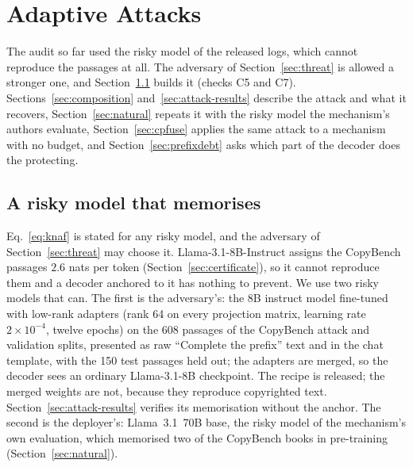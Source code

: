 \section{Adaptive Attacks}\label{sec:attacks}

The audit so far used the risky model of the released logs, which cannot reproduce the passages at all. The adversary of Section~\ref{sec:threat} is allowed a stronger one, and Section~\ref{sec:memorising} builds it (checks C5 and C7). Sections~\ref{sec:composition} and~\ref{sec:attack-results} describe the attack and what it recovers, Section~\ref{sec:natural} repeats it with the risky model the mechanism's authors evaluate, Section~\ref{sec:cpfuse} applies the same attack to a mechanism with no budget, and Section~\ref{sec:prefixdebt} asks which part of the decoder does the protecting.

\subsection{A risky model that memorises}\label{sec:memorising}
Eq.~\eqref{eq:knaf} is stated for any risky model, and the adversary of Section~\ref{sec:threat} may choose it. Llama-3.1-8B-Instruct assigns the CopyBench passages $2.6$ nats per token (Section~\ref{sec:certificate}), so it cannot reproduce them and a decoder anchored to it has nothing to prevent. We use two risky models that can. The first is the adversary's: the 8B instruct model fine-tuned with low-rank adapters (rank 64 on every projection matrix, learning rate $2\times10^{-4}$, twelve epochs) on the 608 passages of the CopyBench attack and validation splits, presented as raw ``Complete the prefix'' text and in the chat template, with the 150 test passages held out; the adapters are merged, so the decoder sees an ordinary Llama-3.1-8B checkpoint. The recipe is released; the merged weights are not, because they reproduce copyrighted text. Section~\ref{sec:attack-results} verifies its memorisation without the anchor. The second is the deployer's: Llama~3.1~70B base, the risky model of the mechanism's own evaluation, which memorised two of the CopyBench books in pre-training~\cite{cooper2025extracting} (Section~\ref{sec:natural}).

